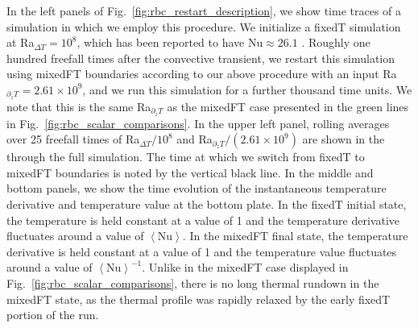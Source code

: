 \documentclass[aps, pre, onecolumn, nofootinbib, notitlepage, groupedaddress, amsfonts, amssymb, amsmath, longbibliography]{revtex4-1}
\newcommand{\angles}[1]{\ensuremath{\left\langle #1 \right\rangle}}
\begin{document}
In the left panels of Fig.~\ref{fig:rbc_restart_description}, we show time traces of a simulation in which we employ this procedure.
We initialize a fixedT simulation at Ra$_{\Delta T} = 10^8$, which has been reported to have $\text{Nu} \approx 26.1$ \cite{zhu&all2018}.
Roughly one hundred freefall times after the convective transient, we restart this simulation using mixedFT boundaries according to our above procedure with an input Ra$_{\partial_z T} = 2.61 \times 10^9$, and we run this simulation for a further thousand time units.
We note that this is the same Ra$_{\partial_z T}$ as the mixedFT case presented in the green lines in Fig.~\ref{fig:rbc_scalar_comparisons}.
In the upper left panel, rolling averages over 25 freefall times of Ra$_{\Delta T} / 10^8$ and Ra$_{\partial_z T} / (2.61 \times 10^9)$ are shown in the through the full simulation.
The time at which we switch from fixedT to mixedFT boundaries is noted by the vertical black line.
In the middle and bottom panels, we show the time evolution of the instantaneous temperature derivative and temperature value at the bottom plate.
In the fixedT initial state, the temperature is held constant at a value of 1 and the temperature derivative fluctuates around a value of $\angles{\text{Nu}}$.
In the mixedFT final state, the temperature derivative is held constant at a value of 1 and the temperature value fluctuates around a value of $\angles{\text{Nu}}^{-1}$.
Unlike in the mixedFT case displayed in Fig.~\ref{fig:rbc_scalar_comparisons}, there is no long thermal rundown in the mixedFT state, as the thermal profile was rapidly relaxed by the early fixedT portion of the run.
\end{document}
